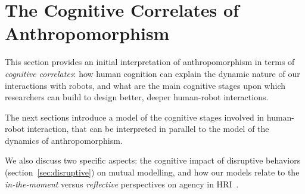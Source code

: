 \documentclass{frontiersSCNS} %
\begin{document}
\section{The Cognitive Correlates of Anthropomorphism}
\label{sec:cognition-neuroscience}

This section provides an initial interpretation of anthropomorphism in
terms of \emph{cognitive correlates}: how human cognition can explain the
dynamic nature of our interactions with robots, and what are the main cognitive
stages upon which researchers can build to design better, deeper human-robot
interactions.

The next sections introduce a model of the cognitive stages involved in
human-robot interaction, that can be interpreted in parallel to the model of the
dynamics of anthropomorphism.

We also discuss two specific aspects: the cognitive impact of disruptive
behaviors (section~\ref{sec:disruptive}) on mutual modelling, and how our models
relate to the \emph{in-the-moment} versus \emph{reflective} perspectives on agency in HRI~\citet{takayama_perspectives_2012}.

%


\end{document}
